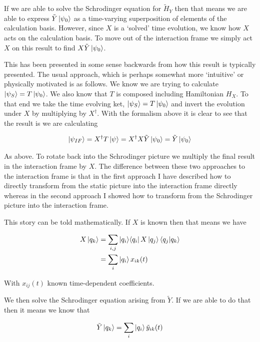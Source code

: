 \documentclass[12pt]{article}
\newcommand{\ketbra}[2]{\Ket{#1}\!\Bra{#2}}
\begin{document}
If we are able to solve the Schrodinger equation for $\tilde{H}_Y$ then that means we are able to express $\tilde{Y}\ket{\psi_0}$ as a time-varying superposition of elements of the calculation basis. However, since $X$ is a `solved' time evolution, we know how $X$ acts on the calculation basis. To move out of the interaction frame we simply act $X$ on this result to find $X\tilde{Y}\ket{\psi_0}$.

This has been presented in some sense backwards from how this result is typically presented. The usual approach, which is perhaps somewhat more `intuitive' or physically motivated is as follows. We know we are trying to calculate $\ket{\psi_S} = T\ket{\psi_0}$. We also know that $T$ is composed including Hamiltonian $H_X$. To that end we take the time evolving ket, $\ket{\psi_S} = T\ket{\psi_0}$ and invert the evolution under $X$ by multiplying by $X^{\dag}$. With the formalism above it is clear to see that the result is we are calculating 

\begin{align}
\ket{\psi_{IF}} = X^{\dag}T\ket{\psi} = X^{\dag}X\tilde{Y}\ket{\psi_0} = \tilde{Y}\ket{\psi_0}
\end{align}

As above. To rotate back into the Schrodinger picture we multiply the final result in the interaction frame by $X$. The difference between these two approaches to the interaction frame is that in the first approach I have described how to directly transform from the static picture into the interaction frame directly whereas in the second approach I showed how to transform from the Schrodinger picture into the interaction frame.

This story can be told mathematically. If $X$ is known then that means we have

\begin{align}
X\ket{q_k} &= \sum_{i,j} \ketbra{q_i}{q_i} X \ket{q_j}\braket{q_j|q_k}\\
&= \sum_{i} \ket{q_i} x_{ik}(t)
\end{align}

With $x_{ij}(t)$ known time-dependent coefficients. 

We then solve the Schrodinger equation arising from $\tilde{Y}$. If we are able to do that then it means we know that

\begin{align}
\tilde{Y}\ket{q_k} = \sum_i \ket{q_i}\tilde{y}_{ik}(t)
\end{align}
\end{document}
